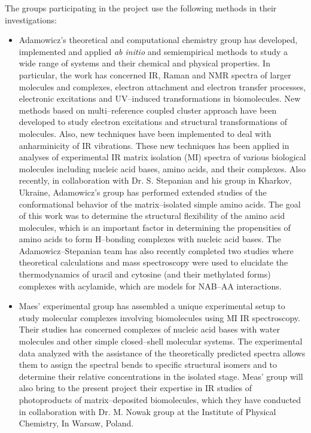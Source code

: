 The groups participating in the project use the following
methods in their investigations:

\begin{itemize}

\item
Adamowicz's theoretical and computational chemistry group
has developed, implemented and applied {\it ab initio} and
semiempirical methods to study a wide range of systems
and their chemical and physical properties. In particular,
the work has concerned IR, Raman and NMR spectra of larger molecules and
complexes, electron attachment and electron transfer 
processes, electronic excitations and UV--induced transformations
in biomolecules. New methods based on multi--reference
coupled cluster approach have been developed to study
electron excitations and structural transformations of molecules.
Also, new techniques have been implemented to deal with
anharminicity of IR vibrations.
These new techniques has been applied in analyses of experimental
IR matrix isolation (MI) spectra of various biological molecules
including nucleic acid bases, amino acids, and their complexes.
Also recently, in collaboration with Dr. S. Stepanian and
his group in Kharkov, Ukraine, Adamowicz's group has performed extended
studies of the conformational behavior of the matrix--isolated
simple amino acids. The goal of this work was to determine the
structural flexibility of the amino acid molecules, which
is an important factor in determining the propensities of
amino acids to form H--bonding complexes with nucleic acid bases.
The Adamowicz--Stepanian team has also recently completed
two studies where theoretical calculations and mass spectroscopy 
were used to elucidate the thermodynamics of uracil and cytosine
(and their methylated forms) complexes with acylamide, which are
models for NAB--AA interactions. 


\item
Maes' experimental group has assembled a unique experimental
setup to study molecular complexes involving biomolecules
using MI IR spectroscopy.
Their studies has concerned complexes of nucleic acid bases
with water molecules and other simple closed--shell molecular
systems. The experimental data analyzed with the assistance
of the theoretically predicted spectra allows them to assign
the spectral bends to specific structural isomers and to determine
their relative concentrations in the isolated stage.
Meas' group will also bring to the present project their
expertise in IR studies of photoproducts of matrix--deposited
biomolecules, which they have conducted in collaboration
with Dr. M. Nowak group at the Institute of Physical Chemistry,
In Warsaw, Poland. 



\end{itemize}
